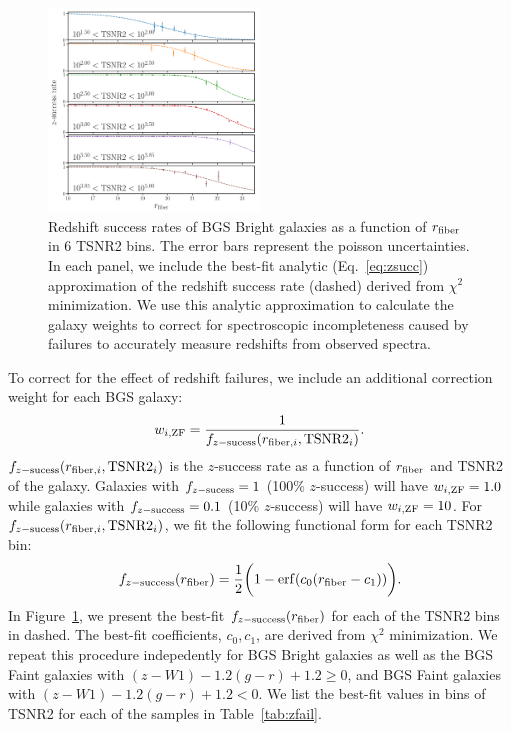 \begin{figure}
\begin{center}
    \includegraphics[width=0.5\textwidth]{figs/bgs_bright_rfib_tsnr2_zsuccess.pdf}
    \caption{
        Redshift success rates of BGS Bright galaxies  as a function of 
        $r_{\rm fiber}$ in 6 TSNR2 bins. 
        The error bars represent the poisson uncertainties.
        In each panel, we include the best-fit analytic (Eq.~\ref{eq:zsucc})
        approximation of the redshift success rate (dashed) derived from
        $\chi^2$ minimization. 
        We use this analytic approximation to calculate the galaxy weights to
        correct for spectroscopic incompleteness caused by failures to
        accurately measure redshifts from observed spectra.
    }\label{fig:zfail1}
\end{center}
\end{figure}

To correct for the effect of redshift failures, we include an additional
correction weight for each BGS galaxy: 
\begin{equation}
    w_{i, {\rm ZF}} = \frac{1}{f_{z-{\rm sucess}}(r_{{\rm fiber},i}, {\rm
    TSNR2}_i)}.
\end{equation} 
$f_{z-{\rm sucess}}(r_{{\rm fiber},i}, {\rm TSNR2}_i)$ is the $z$-success rate
as a function of $r_{\rm fiber}$ and TSNR2 of the galaxy. 
Galaxies with $f_{z-{\rm sucess}} = 1$ (100\% $z$-success) will have 
$w_{i, {\rm ZF}} = 1.0$ while galaxies with $f_{z-{\rm success}} = 0.1$ 
(10\% $z$-success) will have $w_{i, {\rm ZF}} = 10$.
For $f_{z-{\rm sucess}}(r_{{\rm fiber},i}, {\rm TSNR2}_i)$, we fit the
following functional form for each TSNR2 bin: 
\begin{equation} \label{eq:zsucc}
    f_{z-{\rm success}}(r_{\rm fiber}) = \frac{1}{2} \bigg(1-{\rm erf}(c_0
    (r_{\rm fiber} - c_1))\bigg).
\end{equation}
In Figure~\ref{fig:zfail1}, we present the best-fit 
$f_{z-{\rm success}}(r_{\rm fiber})$ for each of the TSNR2 bins in dashed. 
The best-fit coefficients, $c_0, c_1$, are derived from $\chi^2$ minimization.
We repeat this procedure indepedently for BGS Bright galaxies as well as the
BGS Faint galaxies with $(z - W1) - 1.2(g - r) + 1.2 \ge 0$,
and BGS Faint galaxies with $(z - W1) - 1.2(g - r) + 1.2 < 0$.
We list the best-fit values in bins of TSNR2 for each of the samples in
Table~\ref{tab:zfail}. 

